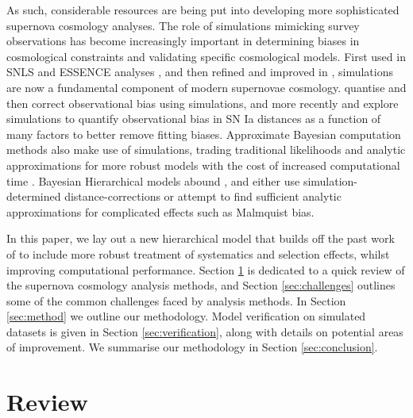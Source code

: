 \documentclass[a4paper,fleqn,usenatbib]{mnras}
\newcommand{\green}{\color{forestgreen}}
\begin{document}
As such, {\green considerable resources are} being put into developing more sophisticated supernova cosmology analyses. The role of simulations mimicking survey observations has become increasingly important in determining biases in cosmological constraints and validating specific cosmological models. First used in SNLS \citep{Astier2006} and ESSENCE analyses \citep{Wood-Vasey2007}, and then refined and improved in \citet{Kessler2009}, simulations are now a fundamental component of modern supernovae cosmology.  \citet{Betoule2014} quantise and then correct observational bias using simulations, and more recently \citet{Scolnic2016} and \citet{Kessler2017} explore simulations to quantify observational bias in SN Ia distances as a function of many factors to better remove fitting biases. Approximate Bayesian computation methods also make use of simulations, trading traditional likelihoods and analytic approximations for more robust models with the cost of increased computational time \citep{Weyant2013, Jennings2016}. Bayesian Hierarchical models abound \citep{Mandel2009, March2011, March2014, Rubin2015, Shariff2016, Roberts2017}, {\green and either use simulation-determined distance-corrections} or attempt to find sufficient analytic approximations for complicated effects such as Malmquist bias.



In this paper, we lay out a new hierarchical model that builds off the past work of \citet{Rubin2015} to include more robust treatment of systematics and selection effects, whilst improving computational performance. Section \ref{sec:review} is dedicated to a quick review of the {\green supernova cosmology analysis methods}, and Section \ref{sec:challenges} outlines some of the common challenges faced by analysis methods. In Section \ref{sec:method} we outline our methodology. Model verification on simulated datasets is given in Section \ref{sec:verification}, along with details on potential areas of improvement. We summarise our methodology in Section \ref{sec:conclusion}.



\section{Review}
\label{sec:review}
\end{document}
